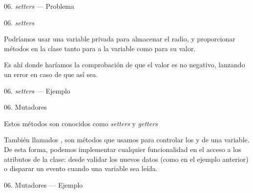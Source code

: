\begin{frame}{06. \textit{setters} — Problema}
  \footnotesize
\end{frame}

\begin{frame}{06. \textit{setters}}
  \begin{block}{}
    \centering
     Podríamos usar una variable privada para almacenar el radio, y
     proporcionar métodos en la clase tanto para  a
     la variable como para  su valor.
  \end{block}

  \begin{center}
    \small
    Es ahí donde haríamos la comprobación de que el valor es no
    negativo, lanzando un error en caso de que así sea.
  \end{center}
\end{frame}

\begin{frame}{06. \textit{setters} — Ejemplo}
  \scriptsize
\end{frame}

\begin{frame}{06. Mutadores}
  \begin{block}{}
    \centering
    Estos métodos son conocidos como \textit{setters} y \textit{getters}
  \end{block}

  \begin{justify}
    \small
    También llamados , son métodos que usamos
    para controlar los  y  de
    una variable. De esta forma, podemos implementar cualquier
    funcionalidad en el acceso a los atributos de la clase: desde
    validar los nuevos datos (como en el ejemplo anterior) o disparar
    un evento cuando una variable sea leída.
  \end{justify}
\end{frame}

\begin{frame}{06. Mutadores — Ejemplo}
  \footnotesize
\end{frame}

